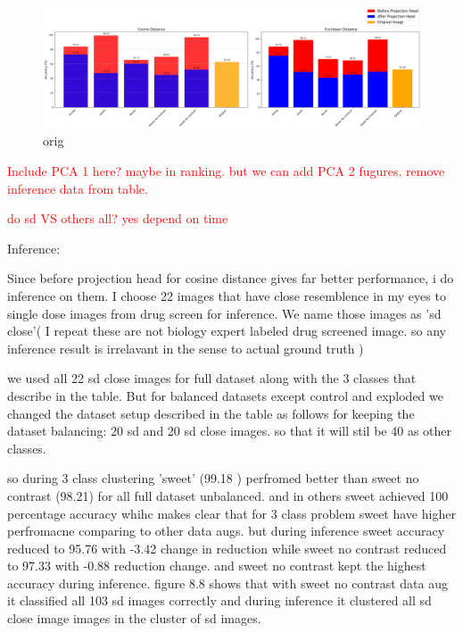 \begin{figure}[H]
    \centering
    \includegraphics[scale=0.37]{figures/cluster.png} 
    \caption{orig}
    \label{fig:cluster}
\end{figure}



\textcolor{red}{Include PCA 1 here? maybe in ranking. but we can add PCA 2 fugures.}
\textcolor{red}{remove inference data from table.}

\textcolor{red}{do sd VS others all? yes depend on time}

Inference:



Since before projection head for cosine distance gives far better performance, i do  inference on them. I choose 22 images that have close resemblence in my eyes 
to single dose images from drug screen for inference. We name those images as 'sd close'( I repeat these are not biology expert labeled drug screened image. so any inference result is irrelavant
 in the sense to actual ground truth )

we used all 22 sd close images for full dataset along with the 3 classes that describe in the table. But for balanced datasets except control and exploded
 we changed the  dataset setup described in the table as follows for keeping the dataset balancing: 20 sd and 20 sd close images. so that it will stil be 40 as other classes.



 so during 3 class clustering 'sweet' (99.18 ) perfromed better than sweet no contrast (98.21) for all full dataset unbalanced. and in others sweet achieved 100 percentage accuracy
 whihc makes clear that for 3 class problem sweet have higher perfromacne comparing to other data augs. but during inference sweet accuracy reduced to 95.76  with -3.42 
 change in reduction while sweet no contrast reduced to  97.33 with -0.88 reduction change. and sweet no contrast kept the highest accuracy during inference. figure 8.8 shows that 
 with sweet no contrast data aug it classified all 103 sd images correctly and during inference it clustered all sd close image images in the cluster of sd images.
 
